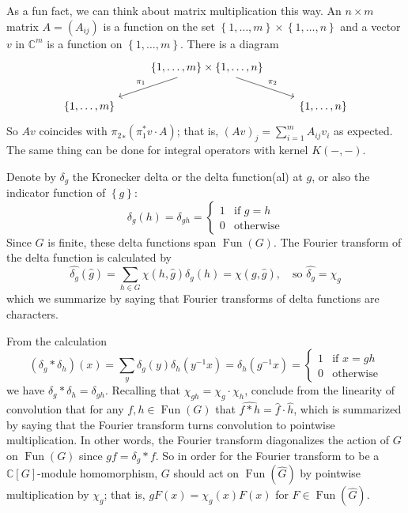 \documentclass[11pt,leqno]{article}
\theoremstyle{plain}
\theoremstyle{definition}
\numberwithin{equation}{section}
\numberwithin{lem}{section}
\newcommand{\cbr}[1]{\left\{#1\right\}}
\DeclareMathOperator{\Fun}{Fun}
\begin{document}
As a fun fact, we can think about matrix multiplication this way. An $n\times m$ matrix $A = (A_{ij})$ is a function on the set $\cbr{1,\dots,m}\times\cbr{1,\dots,n}$ and a vector $v$ in $\mathbb C^m$ is a function on $\cbr{1,\dots,m}$. There is a diagram 
\[\begin{tikzcd}
	& {\cbr{1,\dots,m}\times\cbr{1,\dots,n}} \\
	{\cbr{1,\dots,m}} && {\cbr{1,\dots,n}}
	\arrow["{\pi_1}"', from=1-2, to=2-1]
	\arrow["{\pi_2}", from=1-2, to=2-3]
\end{tikzcd}\]
So $Av$ coincides with ${\pi_2}_\ast(\pi_1^\ast v\cdot A)$; that is, $(Av)_j = \sum_{i=1}^m A_{ij}v_i$ as expected. The same thing can be done for integral operators with kernel $K(-,-)$.

Denote by $\delta_g$ the Kronecker delta or the delta function(al) at $g$, or also the indicator function of $\cbr{g}$:
\[\delta_g(h) = \delta_{gh} = \begin{cases}
	1 & \text{if } g = h\\
	0 & \text{otherwise}
\end{cases}\]
Since $G$ is finite, these delta functions span $\Fun(G)$. The Fourier transform of the delta function is calculated by
\[\widehat{\delta_g}(\hat g) = \sum_{h\in G}\chi(h,\hat g)\delta_g(h) = \chi(g,\hat g), \quad\text{so }\widehat{\delta_g} = \chi_g\]
which we summarize by saying that Fourier transforms of delta functions are characters.

From the calculation 
\[(\delta_g\ast\delta_h)(x) = \sum_{y}\delta_g(y)\delta_h(y^{-1}x) = \delta_h(g^{-1}x) = \begin{cases}
	1 & \text{if } x = gh\\
	0 & \text{otherwise}
\end{cases}\]
we have $\delta_g\ast\delta_h = \delta_{gh}$. Recalling that $\chi_{gh} = \chi_g\cdot \chi_h$, conclude from the linearity of convolution that for any $f,h\in \Fun(G)$ that $\widehat{f\ast h} = \hat f\cdot \hat h$, which is summarized by saying that the Fourier transform turns convolution to pointwise multiplication. In other words, the Fourier transform diagonalizes the action of $G$ on $\Fun(G)$ since $gf = \delta_g\ast f$. So in order for the Fourier transform to be a $\mathbb C[G]$-module homomorphism, $G$ should act on $\Fun(\widehat G)$ by pointwise multiplication by $\chi_g$; that is, $gF(x) = \chi_g(x)F(x)$ for $F\in \Fun(\widehat G)$.
\end{document}
